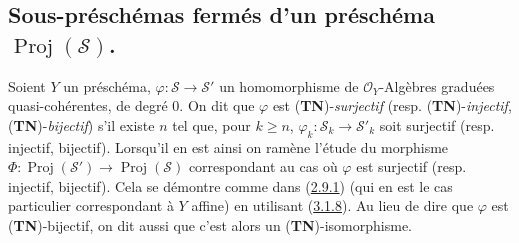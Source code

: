 \subsection{Sous-préschémas fermés d'un préschéma
$\operatorname{Proj}(\mathcal{S})$.}
\label{subsection:II.3.6-fr}

\begin{env}[3.6.1]
\label{II.3.6.1-fr}
Soient $Y$ un préschéma,
$\varphi:\mathcal{S}\to\mathcal{S}'$ un homomorphisme de
$\mathcal{O}_Y$-Algèbres graduées quasi-cohérentes, de degré $0$. On dit que
$\varphi$ est (\textbf{TN})-\emph{surjectif} (resp.
(\textbf{TN})-\emph{injectif}, (\textbf{TN})-\emph{bijectif}) s'il existe $n$
tel que, pour $k\geq n$, $\varphi_k:\mathcal{S}_k\to\mathcal{S}'_k$ soit
surjectif (resp. injectif, bijectif). Lorsqu'il en est ainsi on ramène l'étude
du morphisme
$\Phi:\operatorname{Proj}(\mathcal{S}')\to\operatorname{Proj}(\mathcal{S})$
correspondant au cas où $\varphi$ est surjectif (resp. injectif, bijectif).
Cela se démontre comme dans (\hyperref[II.2.9.1-fr]{2.9.1}) (qui en est le cas
particulier correspondant à $Y$ affine) en utilisant
(\hyperref[II.3.1.8-fr]{3.1.8}). Au lieu de dire que $\varphi$ est
(\textbf{TN})-bijectif, on dit aussi que c'est alors un
(\textbf{TN})-isomorphisme.
\end{env}

